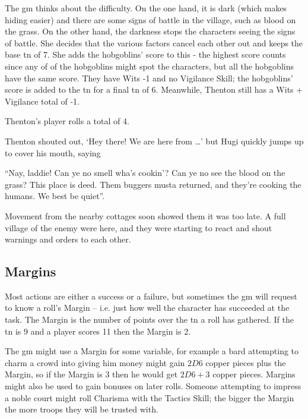 \documentclass[titlepage,a4paper,openany]{book}
\begin{document}
\begin{multicols}{2}
{\begin{exampletext}
	The \gls{gm} thinks about the difficulty.
	On the one hand, it is dark (which makes hiding easier) and there are some signs of battle in the village, such as blood on the grass.
	On the other hand, the darkness stops the characters seeing the signs of battle.
	She decides that the various factors cancel each other out and keeps the base \gls{tn} of 7.
	She adds the hobgoblins' score to this - the highest score counts since any of of the hobgoblins might spot the characters, but all the hobgoblins have the same score.
	They have Wits -1 and no Vigilance Skill; the hobgoblins' score is added to the \gls{tn} for a final \gls{tn} of 6.
	Meanwhile, Thenton still has a Wits + Vigilance total of -1.

	Thenton's player rolls a total of 4.

	Thenton shouted out, `Hey there! We are here from \dots' but Hugi quickly jumps up to cover his mouth, saying

	``Nay, laddie! Can ye no smell wha's cookin'? Can ye no see the blood on the grass? This place is deed. Them buggers musta returned, and they're cooking the humans. We best be quiet''.

	Movement from the nearby cottages soon showed them it was too late. A full village of the enemy were here, and they were starting to react and shout warnings and orders to each other.

\end{exampletext}
}{}

\subsection{Margins}

Most actions are either a success or a failure, but sometimes the \gls{gm} will request to know a roll's Margin -- i.e. just how well the character has succeeded at the task. The Margin is the number of points over the \gls{tn} a roll has gathered. If the \gls{tn} is 9 and a player scores 11 then the Margin is 2.

The \gls{gm} might use a Margin for some variable, for example a bard attempting to charm a crowd into giving him money might gain $2D6$ copper pieces plus the Margin, so if the Margin is 3 then he would get $2D6+3$ copper pieces.
Margins might also be used to gain bonuses on later rolls.
Someone attempting to impress a noble court might roll Charisma with the Tactics Skill; the bigger the Margin the more troops they will be trusted with.


\end{multicols}
\end{document}
